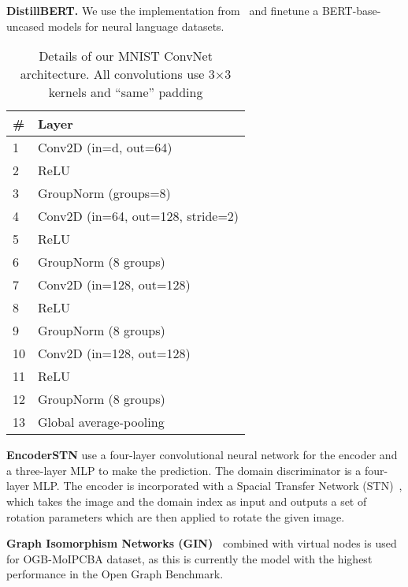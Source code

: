 \documentclass{article} \usepackage{iclr2023_conference,times}
\begin{document}
\noindent\textbf{DistillBERT.} We use the implementation from~\citep{wolf2019huggingface} and finetune a BERT-base-uncased models for neural language datasets. 
\begin{table}
\centering
\caption{Details of our MNIST ConvNet architecture. All convolutions use 3×3 kernels and ``same'' padding}\label{tab:convnet}
\begin{tabular}{@{}ll@{}}
\toprule
\# & Layer                                                     \\ \midrule
1  & \cellcolor[HTML]{FFFFFF}Conv2D (in=d, out=64)             \\
2  & \cellcolor[HTML]{FFFFFF}ReLU                              \\
3  & \cellcolor[HTML]{FFFFFF}GroupNorm (groups=8)              \\
4  & \cellcolor[HTML]{FFFFFF}Conv2D (in=64, out=128, stride=2) \\
5  & \cellcolor[HTML]{FFFFFF}ReLU                              \\
6  & \cellcolor[HTML]{FFFFFF}GroupNorm (8 groups)              \\
7  & \cellcolor[HTML]{FFFFFF}Conv2D (in=128, out=128)          \\
8  & \cellcolor[HTML]{FFFFFF}ReLU                              \\
9  & \cellcolor[HTML]{FFFFFF}GroupNorm (8 groups)              \\
10 & \cellcolor[HTML]{FFFFFF}Conv2D (in=128, out=128)          \\
11 & \cellcolor[HTML]{FFFFFF}ReLU                              \\
12 & \cellcolor[HTML]{FFFFFF}GroupNorm (8 groups)              \\
13 & \cellcolor[HTML]{FFFFFF}Global average-pooling            \\ \bottomrule
\end{tabular}
\end{table}
\noindent\textbf{EncoderSTN} use a four-layer convolutional neural network for the encoder and a three-layer MLP to make the prediction. The domain discriminator is a four-layer MLP. The encoder is incorporated with a Spacial Transfer Network (STN)~\citep{jaderberg2015spatial}, which takes the image and the domain index as input and outputs a set of rotation parameters which are then applied to rotate the given image.


\noindent\textbf{Graph Isomorphism Networks (GIN)~\citep{xu2018powerful}} combined with virtual nodes is used for OGB-MoIPCBA dataset, as this is currently the model with the highest performance in the Open Graph Benchmark. 
\end{document}
